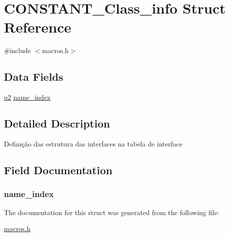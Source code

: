 \hypertarget{struct_c_o_n_s_t_a_n_t___class__info}{}\section{C\+O\+N\+S\+T\+A\+N\+T\+\_\+\+Class\+\_\+info Struct Reference}
\label{struct_c_o_n_s_t_a_n_t___class__info}


{\ttfamily \#include $<$macros.\+h$>$}

\subsection*{Data Fields}
\begin{DoxyCompactItemize}
\item 
\hyperlink{macros_8h_a732cde1300aafb73b0ea6c2558a7a54f}{u2} \hyperlink{struct_c_o_n_s_t_a_n_t___class__info_ae939ac3ca00f5727beaa02d0e339183d}{name\+\_\+index}
\end{DoxyCompactItemize}


\subsection{Detailed Description}
Definição das estrutura das interfaces na tabela de interface 

\subsection{Field Documentation}
\hypertarget{struct_c_o_n_s_t_a_n_t___class__info_ae939ac3ca00f5727beaa02d0e339183d}{}
\subsubsection[{name\+\_\+index}]{ name\+\_\+index}\label{struct_c_o_n_s_t_a_n_t___class__info_ae939ac3ca00f5727beaa02d0e339183d}


The documentation for this struct was generated from the following file\+:\begin{DoxyCompactItemize}
\item 
\hyperlink{macros_8h}{macros.\+h}\end{DoxyCompactItemize}
